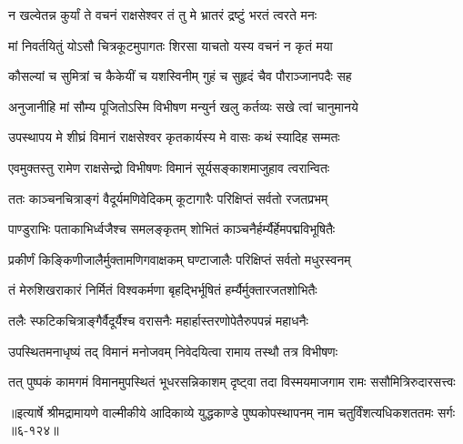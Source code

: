 \twolineshloka
{न खल्वेतन्न कुर्यां ते वचनं राक्षसेश्वर}
{तं तु मे भ्रातरं द्रष्टुं भरतं त्वरते मनः} %

\twolineshloka
{मां निवर्तयितुं योऽसौ चित्रकूटमुपागतः}
{शिरसा याचतो यस्य वचनं न कृतं मया} %

\twolineshloka
{कौसल्यां च सुमित्रां च कैकेयीं च यशस्विनीम्}
{गुहं च सुहृदं चैव पौराञ्जानपदैः सह} %

\twolineshloka
{अनुजानीहि मां सौम्य पूजितोऽस्मि विभीषण}
{मन्युर्न खलु कर्तव्यः सखे त्वां चानुमानये} %

\twolineshloka
{उपस्थापय मे शीघ्रं विमानं राक्षसेश्वर}
{कृतकार्यस्य मे वासः कथं स्यादिह सम्मतः} %

\twolineshloka
{एवमुक्तस्तु रामेण राक्षसेन्द्रो विभीषणः}
{विमानं सूर्यसङ्काशमाजुहाव त्वरान्वितः} %

\twolineshloka
{ततः काञ्चनचित्राङ्गं वैदूर्यमणिवेदिकम्}
{कूटागारैः परिक्षिप्तं सर्वतो रजतप्रभम्} %

\twolineshloka
{पाण्डुराभिः पताकाभिर्ध्वजैश्च समलङ्कृतम्}
{शोभितं काञ्चनैर्हर्म्यैर्हेमपद्मविभूषितैः} %

\twolineshloka
{प्रकीर्णं किङ्किणीजालैर्मुक्तामणिगवाक्षकम्}
{घण्टाजालैः परिक्षिप्तं सर्वतो मधुरस्वनम्} %

\twolineshloka
{तं मेरुशिखराकारं निर्मितं विश्वकर्मणा}
{बृहद्भिर्भूषितं हर्म्यैर्मुक्तारजतशोभितैः} %

\twolineshloka
{तलैः स्फटिकचित्राङ्गैर्वैदूर्यैश्च वरासनैः}
{महार्हास्तरणोपेतैरुपपन्नं महाधनैः} %

\twolineshloka
{उपस्थितमनाधृष्यं तद् विमानं मनोजवम्}
{निवेदयित्वा रामाय तस्थौ तत्र विभीषणः} %

\twolineshloka
{तत् पुष्पकं कामगमं विमानमुपस्थितं भूधरसन्निकाशम्}
{दृष्ट्वा तदा विस्मयमाजगाम रामः ससौमित्रिरुदारसत्त्वः} %


॥इत्यार्षे श्रीमद्रामायणे वाल्मीकीये आदिकाव्ये युद्धकाण्डे पुष्पकोपस्थापनम् नाम चतुर्विंशत्यधिकशततमः सर्गः ॥६-१२४॥
